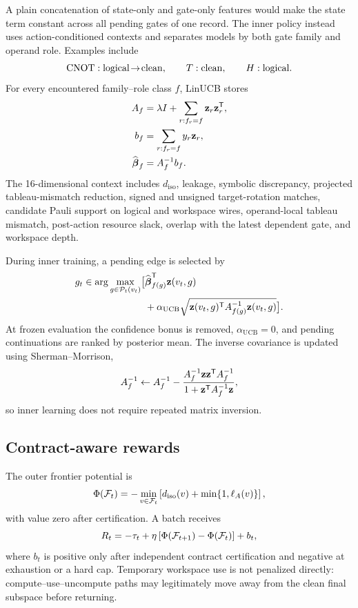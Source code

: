 A plain concatenation of state-only and gate-only features would make the state term constant across all pending gates of one record. The inner policy instead uses action-conditioned contexts and separates models by both gate family and operand role. Examples include
\begin{equation}
\operatorname{CNOT}:\mathrm{logical}\!\rightarrow\!\mathrm{clean},
\qquad
T:\mathrm{clean},
\qquad
H:\mathrm{logical}.
\end{equation}
For every encountered family--role class $f$, LinUCB stores
\begin{align}
A_f&=\lambda I+\sum_{r:f_r=f}\mathbf{z}_r\mathbf{z}_r^\mathsf T,\\
b_f&=\sum_{r:f_r=f}y_r\mathbf{z}_r,\\
\widehat{\boldsymbol{\beta}}_f&=A_f^{-1}b_f.
\label{eq:linucb-estimator}
\end{align}
The 16-dimensional context includes $d_{\mathrm{iso}}$, leakage, symbolic discrepancy, projected tableau-mismatch reduction, signed and unsigned target-rotation matches, candidate Pauli support on logical and workspace wires, operand-local tableau mismatch, post-action resource slack, overlap with the latest dependent gate, and workspace depth.

During inner training, a pending edge is selected by
\begin{equation}
\begin{aligned}
g_t\in\arg\max_{g\in\mathcal{P}_t(v_t)}\bigl[&
\widehat{\boldsymbol{\beta}}_{f(g)}^\mathsf T\mathbf{z}(v_t,g)\\
&+\alpha_{\mathrm{UCB}}
\sqrt{\mathbf{z}(v_t,g)^\mathsf T A_{f(g)}^{-1}\mathbf{z}(v_t,g)}\bigr].
\end{aligned}
\label{eq:linucb-score}
\end{equation}
At frozen evaluation the confidence bonus is removed, $\alpha_{\mathrm{UCB}}=0$, and pending continuations are ranked by posterior mean. The inverse covariance is updated using Sherman--Morrison,
\begin{equation}
A_f^{-1}\leftarrow A_f^{-1}
-\frac{A_f^{-1}\mathbf{z}\mathbf{z}^\mathsf T A_f^{-1}}
{1+\mathbf{z}^\mathsf T A_f^{-1}\mathbf{z}},
\label{eq:sherman-morrison}
\end{equation}
so inner learning does not require repeated matrix inversion.

\subsection{Contract-aware rewards}

The outer frontier potential is
\begin{equation}
\Phi(\mathcal{F}_t)=-\min_{v\in\mathcal{F}_t}
\left[d_{\mathrm{iso}}(v)+\min\{1,\ell_A(v)\}\right],
\label{eq:ancilla-potential}
\end{equation}
with value zero after certification. A batch receives
\begin{equation}
R_t=-\tau_t
+\eta\left[\Phi(\mathcal{F}_{t+1})-\Phi(\mathcal{F}_t)\right]+b_t,
\label{eq:outer-reward}
\end{equation}
where $b_t$ is positive only after independent contract certification and negative at exhaustion or a hard cap. Temporary workspace use is not penalized directly: compute--use--uncompute paths may legitimately move away from the clean final subspace before returning.

